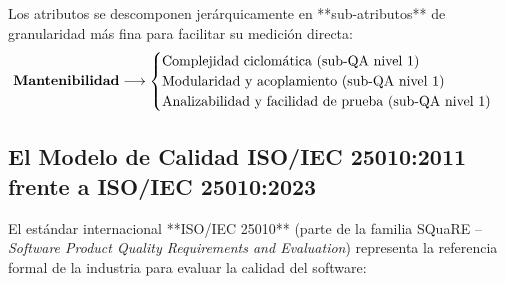 Los atributos se descomponen jerárquicamente en **sub-atributos** de granularidad más fina para facilitar su medición directa:
$$\text{\textbf{Mantenibilidad}} \longrightarrow \begin{cases} \text{Complejidad ciclomática (sub-QA nivel 1)} \\ \text{Modularidad y acoplamiento (sub-QA nivel 1)} \\ \text{Analizabilidad y facilidad de prueba (sub-QA nivel 1)} \end{cases}$$

\subsection{El Modelo de Calidad ISO/IEC 25010:2011 frente a ISO/IEC 25010:2023}

El estándar internacional **ISO/IEC 25010** (parte de la familia SQuaRE -- \emph{Software Product Quality Requirements and Evaluation}) representa la referencia formal de la industria para evaluar la calidad del software:

